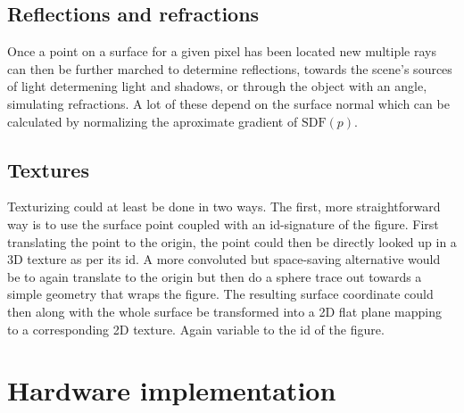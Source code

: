 	\subsection{Reflections and refractions}

                Once a point on a surface for a given pixel has been located
                new multiple rays can then be further marched to determine
                reflections, towards the scene's sources of light determening
                light and shadows, or through the object with an angle,
                simulating refractions. A lot of these depend on the surface
                normal which can be calculated by normalizing the aproximate
                gradient of $\text{SDF}(p)$. 
	
	\subsection{Textures}
		
                Texturizing could at least be done in two ways. The first, more
                straightforward way is to use the surface point coupled with an
                id-signature of the figure. First translating the point to the
                origin, the point could then be directly looked up in a 3D
                texture as per its id. A more convoluted but space-saving
                alternative would be to again translate to the origin but then
                do a sphere trace out towards a simple geometry that wraps the
                figure. The resulting surface coordinate could then along with
                the whole surface be transformed into a 2D flat plane mapping
                to a corresponding 2D texture. Again variable to the id of the
                figure.
	
	\section{Hardware implementation}

